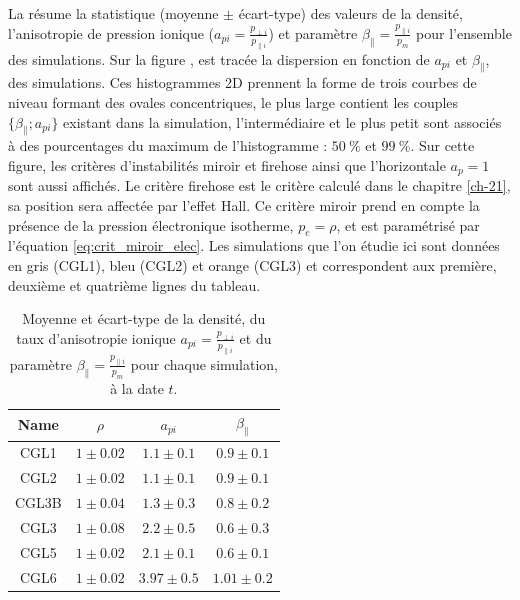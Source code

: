 La  résume la statistique (moyenne $\pm$ écart-type) des valeurs de la densité, l'anisotropie de pression ionique ($a_{pi} = \frac{p_{\perp i}}{p_{\parallel i}}$) et paramètre $\beta_{\parallel} = \frac{p_{\parallel i}}{p_{m}}$ pour l'ensemble des simulations. Sur la figure , est tracée la dispersion en fonction de $a_{pi}$ et $\beta_{\parallel}$, des simulations. Ces histogrammes \acs{2D} prennent la forme de trois courbes de niveau formant des ovales concentriques, le plus large contient les couples $\{\beta_{\parallel};a_{pi}\}$ existant dans la simulation, l'intermédiaire et le plus petit sont associés à des pourcentages du maximum de l'histogramme : $\SI{50}{\%}$ et $\SI{99}{\%}$. Sur cette figure, les critères d'instabilités miroir et firehose ainsi que l'horizontale $a_{p} =  1$ sont aussi affichés. Le critère firehose est le critère calculé dans le chapitre \ref{ch-21}, sa position sera affectée par l'effet Hall. Ce critère miroir prend en compte la présence de la pression électronique isotherme, $p_e = \rho$, et est paramétrisé par l'équation \eqref{eq:crit_miroir_elec}. Les simulations que l'on étudie ici sont données en 
gris (CGL1), bleu (CGL2) et orange (CGL3) et correspondent aux première, deuxième et quatrième lignes du tableau. 
 \begin{table}[!ht]
\begin{center}
\begin{tabular}{ c|c|c|c } 
Name & $\rho$ & $a_{pi}$  & $\beta_{\parallel}$\\
\hline
CGL1 & $\num{1}\pm \num{0.02}$ & $\num{1.1}\pm \num{0.1}$ & $\num{0.9}\pm \num{0.1}$ \\
CGL2 & $\num{1}\pm \num{0.02}$ & $\num{1.1}\pm \num{0.1}$ & $\num{0.9}\pm \num{0.1}$   \\
CGL3B & $\num{1}\pm \num{0.04}$ & $\num{1.3}\pm \num{0.3}$ & $\num{0.8}\pm \num{0.2}$   \\
CGL3 & $\num{1}\pm \num{0.08}$ & $\num{2.2}\pm \num{0.5}$ & $\num{0.6}\pm \num{0.3}$  \\
CGL5 & $\num{1}\pm \num{0.02}$ & $\num{2.1}\pm \num{0.1}$ & $\num{0.6}\pm \num{0.1}$  \\
CGL6 & $\num{1}\pm \num{0.02}$ & $\num{3.97}\pm \num{0.5}$ & $\num{1.01}\pm \num{0.2}$  \\
\end{tabular}
\caption{Moyenne et écart-type de la densité, du taux d'anisotropie ionique $a_{pi} = \frac{p_{\perp i}}{p_{\parallel i}}$ et du paramètre $\beta_{\parallel} = \frac{p_{\parallel i}}{p_{m}}$ pour chaque simulation, à la date $t$. \label{tab:stat_CGL}}
\end{center}
\end{table}
